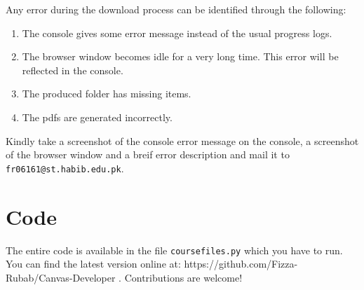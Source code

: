 \documentclass[
]{article}
\providecommand{\tightlist}{%
  \setlength{\itemsep}{0pt}\setlength{\parskip}{0pt}}
\begin{document}
Any error during the download process can be identified through the
following:

\begin{enumerate}
\def\labelenumi{\arabic{enumi}.}
\tightlist
\item
  The console gives some error message instead of the usual progress
  logs.
\item
  The browser window becomes idle for a very long time. This error will
  be reflected in the console.
\item
  The produced folder has missing items.
\item
  The pdfs are generated incorrectly.
\end{enumerate}

Kindly take a screenshot of the console error message on the console, a
screenshot of the browser window and a breif error description and mail
it to \texttt{fr06161@st.habib.edu.pk}.

\hypertarget{code}{%
\section{Code}\label{code}}

The entire code is available in the file \texttt{coursefiles.py} which
you have to run. You can find the latest version online at:
https://github.com/Fizza-Rubab/Canvas-Developer . Contributions are
welcome!
\end{document}

